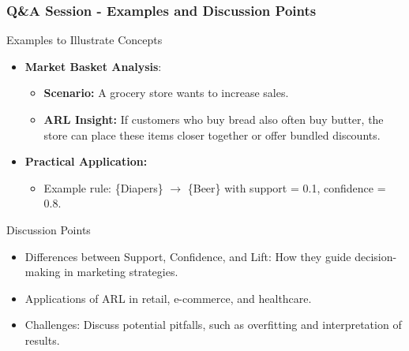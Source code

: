 \documentclass[aspectratio=169]{beamer}
\begin{document}
\begin{frame}[fragile]
    \frametitle{Q\&A Session - Examples and Discussion Points}
    \begin{block}{Examples to Illustrate Concepts}
        \begin{itemize}
            \item \textbf{Market Basket Analysis}:
                \begin{itemize}
                    \item \textbf{Scenario:} A grocery store wants to increase sales.
                    \item \textbf{ARL Insight:} If customers who buy bread also often buy butter, the store can place these items closer together or offer bundled discounts.
                \end{itemize}
            \item \textbf{Practical Application:}
                \begin{itemize}
                    \item Example rule: \{Diapers\} $\rightarrow$ \{Beer\} with support = 0.1, confidence = 0.8.
                \end{itemize}
        \end{itemize}
    \end{block}

    \begin{block}{Discussion Points}
        \begin{itemize}
            \item Differences between Support, Confidence, and Lift: How they guide decision-making in marketing strategies.
            \item Applications of ARL in retail, e-commerce, and healthcare.
            \item Challenges: Discuss potential pitfalls, such as overfitting and interpretation of results.
        \end{itemize}
    \end{block}
\end{frame}
\end{document}
